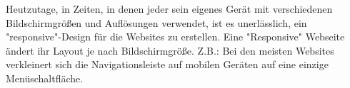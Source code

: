 
Heutzutage, in Zeiten, in denen jeder sein eigenes Gerät mit verschiedenen Bildschirmgrößen und Auflösungen verwendet, ist es unerlässlich, ein "responsive"-Design für die Websites zu erstellen. Eine "Responsive" Webseite ändert ihr Layout je nach Bildschirmgröße. Z.B.: Bei den meisten Websites verkleinert sich die Navigationsleiste auf mobilen Geräten auf eine einzige Menüschaltfläche.

